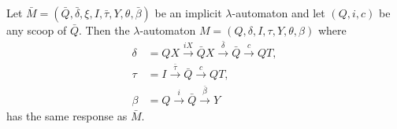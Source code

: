 Let $\bar{M} = (\bar{Q}, \bar{\delta}, \xi, I, \bar{\tau}, Y, \theta, \bar{\beta})$ be an implicit $\lambda$-automaton and let $(Q, i, c)$ be any scoop of $\bar{Q}$. Then the $\lambda$-automaton $M = (Q, \delta, I, \tau, Y, \theta, \beta)$ where
\begin{align*}
\delta &= QX \xrightarrow{iX} \bar{Q}X \xrightarrow{\bar{\delta}} \bar{Q} \xrightarrow{c} QT,\\[4pt]
\tau &= I \xrightarrow{\bar{\tau}} \bar{Q} \xrightarrow{c} QT,\\[4pt]
\beta &= Q \xrightarrow{i} \bar{Q} \xrightarrow{\bar{\beta}} Y
\end{align*}
has the same response as $\bar{M}$.
